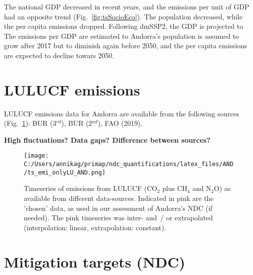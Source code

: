 \documentclass[12pt]{article}
\begin{document}
 The national GDP decreased in recent years, and the emissions per unit of GDP had an opposite trend (Fig.~\ref{fig:tsSocioEco}).
 The population decreased, while the per capita emissions dropped. 
 Following dmSSP2, the GDP is projected to 
 The emissions per GDP are estimated to 
 Andorra's population is assumed to grow after 2017 but to diminish again before 2050, and the per capita emissions are expected to decline towars 2050. 

 \section{LULUCF emissions}
 \label{sec:emiLULUCF}
 LULUCF emissions data for Andorra are available from the following sources (Fig.~\ref{fig:tsLULUCF}): BUR (3$^{rd}$), BUR (2$^{nd}$), FAO (2019).

 \textbf{High fluctuations? Data gaps? Difference between sources?}
 \begin{figure}[htbp]
 \centering
 \texttt{[image: C:/Users/annikag/primap/ndc\_quantifications/latex\_files/AND/ts\_emi\_onlyLU\_AND.png]}
 \caption{Timeseries of emissions from LULUCF (CO$_2$ plus CH$_4$ and N$_2$O) as available from different data-sources. 
 Indicated in pink are the 'chosen' data, as used in our assessment of Andorra's NDC (if needed). 
 The pink timeseries was inter- and~/ or extrapolated (interpolation: linear, extrapolation: constant).}
 \label{fig:tsLULUCF}
 \end{figure}

 \section{Mitigation targets (NDC)}
 \label{sec:mitiTars}
\end{document}
